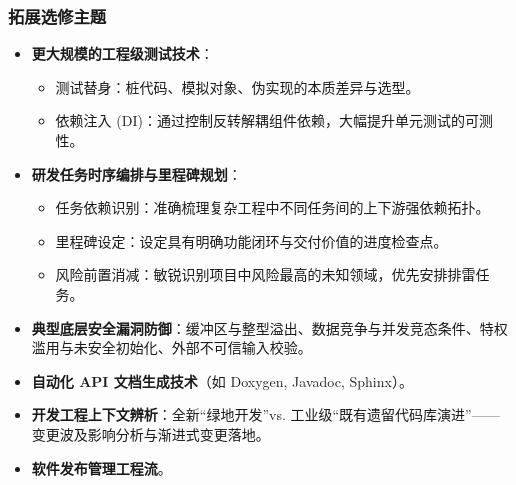 \subsubsection{拓展选修主题}
\begin{itemize}
    \item \textbf{更大规模的工程级测试技术}：
    \begin{itemize}
        \item 测试替身：桩代码、模拟对象、伪实现的本质差异与选型。
        \item 依赖注入 (DI)：通过控制反转解耦组件依赖，大幅提升单元测试的可测性。
    \end{itemize}
    \item \textbf{研发任务时序编排与里程碑规划}：
    \begin{itemize}
        \item 任务依赖识别：准确梳理复杂工程中不同任务间的上下游强依赖拓扑。
        \item 里程碑设定：设定具有明确功能闭环与交付价值的进度检查点。
        \item 风险前置消减：敏锐识别项目中风险最高的未知领域，优先安排排雷任务。
    \end{itemize}
    \item \textbf{典型底层安全漏洞防御}：缓冲区与整型溢出、数据竞争与并发竞态条件、特权滥用与未安全初始化、外部不可信输入校验。
    \item \textbf{自动化 API 文档生成技术}（如 Doxygen, Javadoc, Sphinx）。
    \item \textbf{开发工程上下文辨析}：全新“绿地开发”vs. 工业级“既有遗留代码库演进”——变更波及影响分析与渐进式变更落地。
    \item \textbf{软件发布管理工程流}。
\end{itemize}

